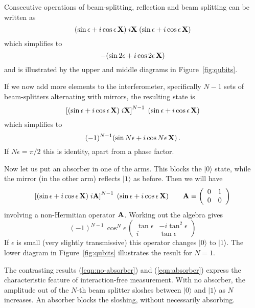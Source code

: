 \documentclass[prb,preprint]{revtex4-1}
\def\ket#1{|#1\rangle}
\def\X{{\bf X}}
\def\A{{\bf A}}
\begin{document}
Consecutive operations of beam-splitting, reflection and beam
splitting can be written as
\begin{equation}
     (\sin\epsilon + i\cos\epsilon\,\X)
     \; i\X \;
     (\sin\epsilon + i\cos\epsilon\,\X)
\end{equation}
which simplifies to
\begin{equation}
     -(\sin2\epsilon + i\cos2\epsilon\,\X)
\label{eqn:no-absorber}
\end{equation}
and is illustrated by the upper and middle diagrams in
Figure~\ref{fig:qubits}.

If we now add more elements to the interferometer, specifically $N-1$
sets of beam-splitters alternating with mirrors, the resulting state
is
\begin{equation}
     \left[ (\sin\epsilon + i\cos\epsilon\,\X) \; i\X \right]^{N-1} \;
     (\sin\epsilon + i\cos\epsilon\,\X)
\end{equation}
which simplifies to
\begin{equation}
     (-1)^{N-1} (\sin N\epsilon + i\cos N\epsilon\,\X)  \,.
\end{equation}
If $N\epsilon=\pi/2$ this is identity, apart from a phase factor.

Now let us put an absorber in one of the arms.  This blocks the
$\ket0$ state, while the mirror (in the other arm) reflects $\ket1$ as
before.  Then we will have
\begin{equation}
     \left[ (\sin\epsilon + i\cos\epsilon\,\X) \; i\A \right]^{N-1} \;
     (\sin\epsilon + i\cos\epsilon\,\X)
  \qquad
   \A \equiv \left( \begin{array}{cc} 0 & 1 \\ 0 & 0 \end{array} \right)
\end{equation}
involving a non-Hermitian operator $\A$.  Working out the algebra
gives
\begin{equation}
(-1)^{N-1} \, \cos^N\!\epsilon \,
\left( \begin{array}{cc} \tan\epsilon & -i\tan^2\epsilon \\
                         i            & \tan\epsilon 
       \end{array} \right)
\label{eqn:absorber}
\end{equation}
If $\epsilon$ is small (very slightly transmissive) this operator
changes $\ket0$ to $\ket1$.  The lower diagram in
Figure~\ref{fig:qubits} illustrates the result for $N=1$.

The contrasting results (\ref{eqn:no-absorber}) and
(\ref{eqn:absorber}) express the characteristic feature of
interaction-free measurement.  With no absorber, the amplitude out of
the $N$-th beam splitter sloshes between $\ket0$ and $\ket1$ as $N$
increases.  An absorber blocks the sloshing, without necessarily
absorbing.
\end{document}
